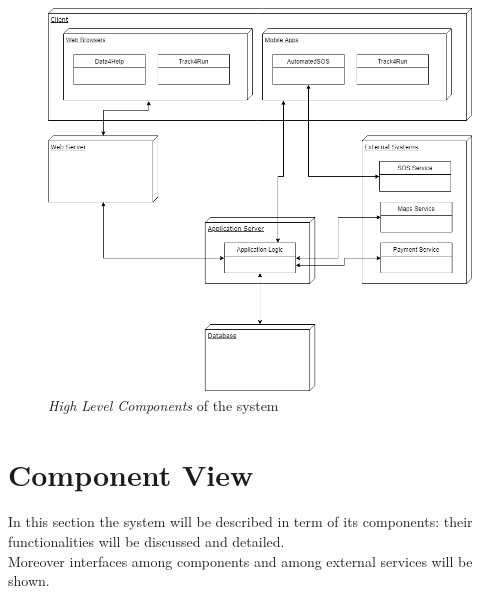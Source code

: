 \begin{figure}[H]
  \begin{center}
  	\includegraphics[width=\textwidth]{./img/HighLevelComponents.png}
    \hspace{0.05\linewidth}
    \centering
    \caption{\textit{High Level Components} of the system}
		\label{img:highLevelComponents}
    \end{center}
\end{figure}

\clearpage
\section{Component View}
In this section the system will be described in term of its components:  their functionalities will be discussed and detailed.\\
Moreover interfaces among components and among external services will be shown.

